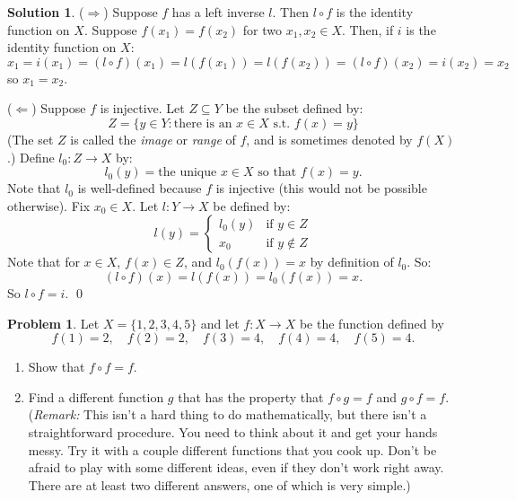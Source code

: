 \documentclass{article}
\numberwithin{equation}{section}
\theoremstyle{plain}
\theoremstyle{definition}
\newtheorem{problem}{Problem}
\newtheorem*{solution*}{Solution}
\begin{document}
\begin{solution*}
	($\Longrightarrow$) Suppose $f$ has a left inverse $l$. Then $l \circ f$ is the identity function on $X$. Suppose $f(x_1) = f(x_2)$ for two $x_1, x_2 \in X$. Then, if $i$ is the identity function on $X$:
	\[
	x_1 = i(x_1) = (l \circ f)(x_1) = l(f(x_1)) = l(f(x_2)) = (l \circ f)(x_2) = i(x_2) = x_2
	\]
	so $x_1 = x_2$. 
	
	($\Longleftarrow$) Suppose $f$ is injective. Let $Z \subseteq Y$ be the subset defined by: 
	\[
	Z = \{y \in Y : \textrm{there is an } x \in X \textrm{ s.t. } f(x) = y\}
	\]
	(The set $Z$ is called the \emph{image} or \emph{range} of $f$, and is sometimes denoted by $f(X)$.) Define $l_0 : Z \to X$ by: 
	\[
	l_0(y) = \textrm{the unique $x \in X$ so that $f(x) = y$.}
	\]
	Note that $l_0$ is well-defined because $f$ is injective (this would not be possible otherwise). Fix $x_0 \in X$. Let $l : Y \to X$ be defined by: \[
	l(y) = \begin{cases}
	l_0(y) & \textrm{if } y \in Z \\
	x_0 & \textrm{if } y \not\in Z
	\end{cases}
	\]
	Note that for $x \in X$, $f(x) \in Z$, and $l_0(f(x)) = x$ by definition of $l_0$. So: 
	\[
	(l \circ f)(x) = l(f(x)) = l_0(f(x)) = x.
	\]
	So $l \circ f = i$. \qed
\end{solution*}

\begin{problem}
	Let $X = \{1,2,3,4,5\}$ and let $f : X \to X$ be the function defined by 
	\[
	f(1) = 2, \quad f(2) = 2, \quad f(3) = 4, \quad f(4) = 4, \quad f(5) = 4.
	\]
	\begin{enumerate}[label=(\alph*)]
		\item Show that $f \circ f = f$. 
		\item Find a different function $g$ that has the property that $f \circ g = f$ and $g \circ f = f$. (\emph{Remark:} This isn't a hard thing to do mathematically, but there isn't a straightforward procedure. You need to think about it and get your hands messy. Try it with a couple different functions that you cook up. Don't be afraid to play with some different ideas, even if they don't work right away. There are at least two different answers, one of which is very simple.)
	\end{enumerate}
\end{problem}
\end{document}
